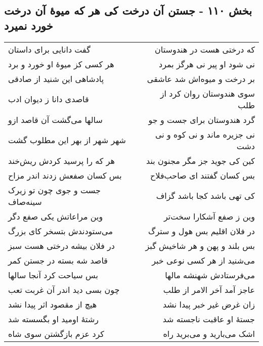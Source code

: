 \begin{center}
\section*{بخش ۱۱۰ - جستن آن درخت کی هر که میوهٔ  آن درخت خورد نمیرد}
\label{sec:sh110}
\begin{longtable}{l p{0.5cm} r}
گفت دانایی برای داستان
&&
که درختی هست در هندوستان
\\
هر کسی کز میوهٔ او خورد و برد
&&
نی شود او پیر نی هرگز بمرد
\\
پادشاهی این شنید از صادقی
&&
بر درخت و میوه‌اش شد عاشقی
\\
قاصدی دانا ز دیوان ادب
&&
سوی هندوستان روان کرد از طلب
\\
سالها می‌گشت آن قاصد ازو
&&
گرد هندوستان برای جست و جو
\\
شهر شهر از بهر این مطلوب گشت
&&
نی جزیره ماند و نی کوه و نی دشت
\\
هر که را پرسید کردش ریش‌خند
&&
کین کی جوید جز مگر مجنون بند
\\
بس کسان صفعش زدند اندر مزاح
&&
بس کسان گفتند ای صاحب‌فلاح
\\
جست و جوی چون تو زیرک سینه‌صاف
&&
کی تهی باشد کجا باشد گزاف
\\
وین مراعاتش یکی صفع دگر
&&
وین ز صفع آشکارا سخت‌تر
\\
می‌ستودندش بتسخر کای بزرگ
&&
در فلان اقلیم بس هول و سترگ
\\
در فلان بیشه درختی هست سبز
&&
بس بلند و پهن و هر شاخیش گبز
\\
قاصد شه بسته در جستن کمر
&&
می‌شنید از هر کسی نوعی خبر
\\
بس سیاحت کرد آنجا سالها
&&
می‌فرستادش شهنشه مالها
\\
چون بسی دید اندر آن غربت تعب
&&
عاجز آمد آخر الامر از طلب
\\
هیچ از مقصود اثر پیدا نشد
&&
زان غرض غیر خبر پیدا نشد
\\
رشتهٔ اومید او بگسسته شد
&&
جستهٔ او عاقبت ناجسته شد
\\
کرد عزم بازگشتن سوی شاه
&&
اشک می‌بارید و می‌برید راه
\\
\end{longtable}
\end{center}
